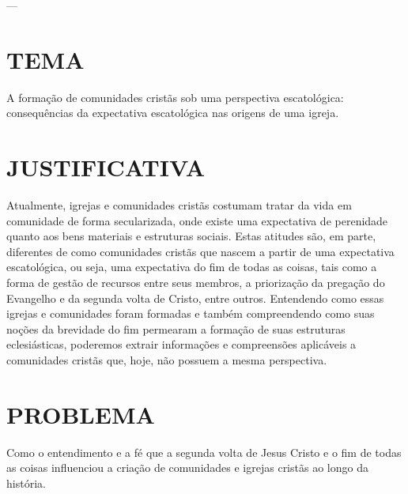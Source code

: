 \documentclass[
    article,            %
	12pt,				%
	oneside,			%
	a4paper,			%
	chapter=TITLE,		%
	section=TITLE,		%
	english,			%
	french,				%
	spanish,			%
	brazil				%
	]{abntex2}
\begin{document}



\imprimircapa

\imprimirfolhaderosto

---

\textual
\pagestyle{simple}


\section*{TEMA}
A formação de comunidades cristãs sob uma perspectiva escatológica: consequências da expectativa escatológica nas origens de uma igreja.

\section*{JUSTIFICATIVA}
Atualmente, igrejas e comunidades cristãs costumam tratar da vida em comunidade de forma secularizada, onde existe uma expectativa de perenidade quanto aos bens materiais e estruturas sociais. Estas atitudes são, em parte, diferentes de como comunidades cristãs que nascem a partir de uma expectativa escatológica, ou seja, uma expectativa do fim de todas as coisas, tais como a forma de gestão de recursos entre seus membros, a priorização da pregação do Evangelho e da segunda volta de Cristo, entre outros. Entendendo como essas igrejas e comunidades foram formadas e também compreendendo como suas noções da brevidade do fim permearam a formação de suas estruturas eclesiásticas, poderemos extrair informações e compreensões aplicáveis a comunidades cristãs que, hoje, não possuem a mesma perspectiva.

\section*{PROBLEMA}
Como o entendimento e a fé que a segunda volta de Jesus Cristo e o fim de todas as coisas influenciou a criação de comunidades e igrejas cristãs ao longo da história.
\end{document}
